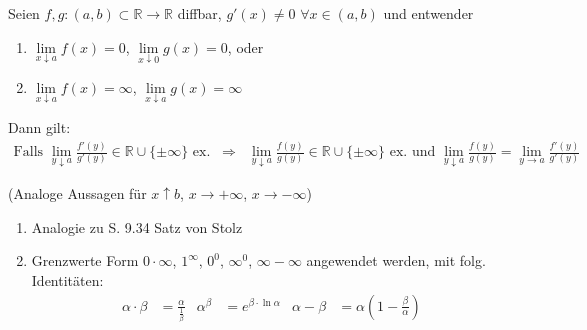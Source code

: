 \begin{proposition}
	Seien $f,g:(a,b)\subset\mathbb{R}\to\mathbb{R}$ \gls{diffbar}, $g'(x) \neq 0$ $\forall x\in(a,b)$ und entwender
	\begin{enumerate}[label={\roman*)}]
		\item $\lim\limits_{x\downarrow a} f(x) = 0$, $\lim\limits_{x\downarrow 0} g(x) = 0$, oder
		\item $\lim\limits_{x\downarrow a} f(x) =\infty$, $\lim\limits_{x\downarrow a} g(x) = \infty$
	\end{enumerate}

	Dann gilt:
	\begin{align}
		\text{Falls $\lim\limits_{y\downarrow a} \frac{f'(y)}{g'(y)} \in\mathbb{R}\cup \{ \pm\infty \}$ ex.} \;\; \Rightarrow \;\; \lim\limits_{y\downarrow a} \frac{f(y)}{g(y)} \in\mathbb{R}\cup \{ \pm\infty \}\text{ ex. und }\lim\limits_{y\downarrow a} \frac{f(y)}{g(y)} = \lim\limits_{y\to a} \frac{f'(y)}{g'(y)}
	\end{align}
	
	(Analoge Aussagen für $x\uparrow b$, $x\to +\infty$, $x\to-\infty$)
\end{proposition}

\begin{remark}
	\vspace*{0pt}
	\begin{enumerate}[label={\arabic*)},topsep=\dimexpr-\baselineskip/2\relax]
		\item Analogie zu S. 9.34 Satz von Stolz
		\item Grenzwerte Form $0\cdot \infty$, $1^{\infty}$, $0^0$, $\infty^0$, $\infty - \infty$ angewendet werden, mit folg. Identitäten: \begin{align*}
			\alpha\cdot\beta &= \frac{\alpha}{\frac{1}{\beta}} & \alpha^\beta &= e^{\beta \cdot \ln \alpha} & \alpha - \beta &= \alpha \left( 1 - \frac{\beta}{\alpha} \right)
		\end{align*}
	\end{enumerate}
\end{remark}

